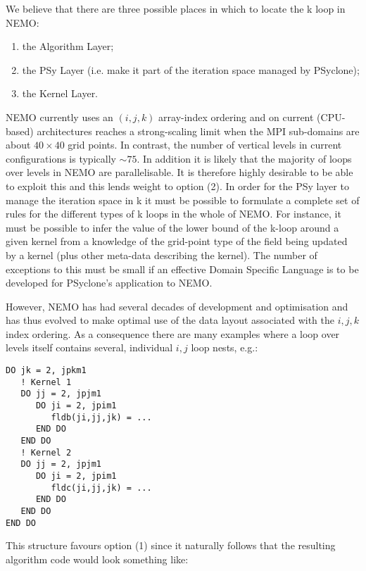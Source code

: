 \documentclass{article}
\newcommand{\psyclone}{{PS}yclone}
\begin{document}
We believe that there are three possible places in which to locate the
k loop in NEMO:

\begin{enumerate}

\item the Algorithm Layer;

\item the PSy Layer (i.e. make it part of the iteration space managed
  by \psyclone);

\item the Kernel Layer.

\end{enumerate}

NEMO currently uses an $(i,j,k)$ array-index ordering and on current
(CPU-based) architectures reaches a strong-scaling limit when the MPI
sub-domains are about $40\times 40$ grid points. In contrast, the
number of vertical levels in current configurations is typically
$\sim75$. In addition it is likely that the majority of loops over
levels in NEMO are parallelisable. It is therefore highly desirable to
be able to exploit this and this lends weight to option (2). In order
for the PSy layer to manage the iteration space in k it must be
possible to formulate a complete set of rules for the different types
of k loops in the whole of NEMO. For instance, it must be possible to
infer the value of the lower bound of the k-loop around a given kernel
from a knowledge of the grid-point type of the field being updated by
a kernel (plus other meta-data describing the kernel). The number of
exceptions to this must be small if an effective Domain Specific
Language is to be developed for \psyclone's application to NEMO.

However, NEMO has had several decades of development and optimisation
and has thus evolved to make optimal use of the data layout associated
with the $i,j,k$ index ordering. As a consequence there are many
examples where a loop over levels itself contains several, individual
$i,j$ loop nests, e.g.:

\begin{verbatim}
DO jk = 2, jpkm1
   ! Kernel 1
   DO jj = 2, jpjm1
      DO ji = 2, jpim1
         fldb(ji,jj,jk) = ...
      END DO
   END DO
   ! Kernel 2
   DO jj = 2, jpjm1
      DO ji = 2, jpim1
         fldc(ji,jj,jk) = ...
      END DO
   END DO
END DO
\end{verbatim}

This structure favours option (1) since it naturally follows that the
resulting algorithm code would look something like:
\end{document}
